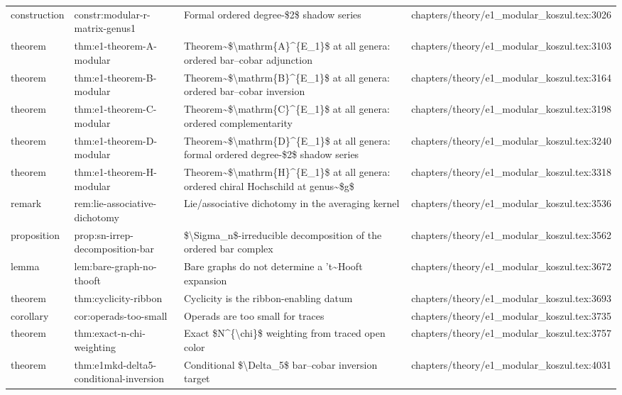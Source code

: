\documentclass[11pt]{article}
\begin{document}
\begin{longtable}{L{0.10\textwidth}L{0.26\textwidth}L{0.42\textwidth}L{0.22\textwidth}}
construction & constr:modular-r-matrix-genus1 & Formal ordered degree-\$2\$ shadow series & chapters/theory/e1\_modular\_koszul.tex:3026\\
theorem & thm:e1-theorem-A-modular & Theorem\textasciitilde{}\$\textbackslash{}mathrm\{A\}\textasciicircum{}\{E\_1\}\$ at all genera: ordered bar--cobar adjunction & chapters/theory/e1\_modular\_koszul.tex:3103\\
theorem & thm:e1-theorem-B-modular & Theorem\textasciitilde{}\$\textbackslash{}mathrm\{B\}\textasciicircum{}\{E\_1\}\$ at all genera: ordered bar--cobar inversion & chapters/theory/e1\_modular\_koszul.tex:3164\\
theorem & thm:e1-theorem-C-modular & Theorem\textasciitilde{}\$\textbackslash{}mathrm\{C\}\textasciicircum{}\{E\_1\}\$ at all genera: ordered complementarity & chapters/theory/e1\_modular\_koszul.tex:3198\\
theorem & thm:e1-theorem-D-modular & Theorem\textasciitilde{}\$\textbackslash{}mathrm\{D\}\textasciicircum{}\{E\_1\}\$ at all genera: formal ordered degree-\$2\$ shadow series & chapters/theory/e1\_modular\_koszul.tex:3240\\
theorem & thm:e1-theorem-H-modular & Theorem\textasciitilde{}\$\textbackslash{}mathrm\{H\}\textasciicircum{}\{E\_1\}\$ at all genera: ordered chiral Hochschild at genus\textasciitilde{}\$g\$ & chapters/theory/e1\_modular\_koszul.tex:3318\\
remark & rem:lie-associative-dichotomy & Lie/associative dichotomy in the averaging kernel & chapters/theory/e1\_modular\_koszul.tex:3536\\
proposition & prop:sn-irrep-decomposition-bar & \$\textbackslash{}Sigma\_n\$-irreducible decomposition of the ordered bar complex & chapters/theory/e1\_modular\_koszul.tex:3562\\
lemma & lem:bare-graph-no-thooft & Bare graphs do not determine a 't\textasciitilde{}Hooft expansion & chapters/theory/e1\_modular\_koszul.tex:3672\\
theorem & thm:cyclicity-ribbon & Cyclicity is the ribbon-enabling datum & chapters/theory/e1\_modular\_koszul.tex:3693\\
corollary & cor:operads-too-small & Operads are too small for traces & chapters/theory/e1\_modular\_koszul.tex:3735\\
theorem & thm:exact-n-chi-weighting & Exact \$N\textasciicircum{}\{\textbackslash{}chi\}\$ weighting from traced op{}en color & chapters/theory/e1\_modular\_koszul.tex:3757\\
theorem & thm:e1mkd-delta5-cond{}itional-inversion & Cond{}itional \$\textbackslash{}Delta\_5\$ bar--cobar inversion target & chapters/theory/e1\_modular\_koszul.tex:4031\\

\end{longtable}
\end{document}
